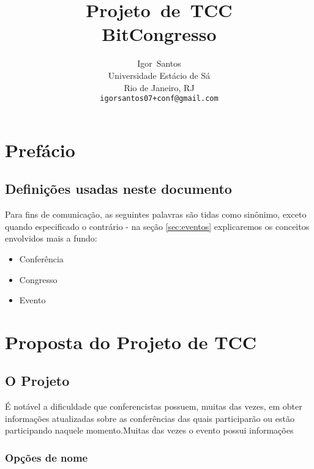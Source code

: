 \documentclass[a4paper]{abntex2}
\author{Igor~Santos\\
	Universidade Est\'acio de S\'a\\
	Rio de Janeiro, RJ\\
	\texttt{igorsantos07+conf@gmail.com}
}
\title{Projeto~de~TCC\\BitCongresso}
\begin{document}
\maketitle


\chapter*{Prefácio}
\section*{Definições usadas neste documento}
Para fins de comunicação, as seguintes palavras são tidas como sinônimo, exceto quando especificado o contrário - na seção \ref{sec:eventos} explicaremos os conceitos envolvidos mais a fundo:
\begin{itemize}
	\item Conferência
	\item Congresso
	\item Evento
\end{itemize}
\newpage

\tableofcontents

\chapter{Proposta do Projeto de TCC}

\section{O Projeto}

É notável a dificuldade que conferencistas possuem, muitas das vezes, em obter informações atualizadas sobre as conferências das quais participarão ou estão participando naquele momento.\footnotemark Muitas das vezes o evento possui informações 


\subsection*{Opções de nome}
\end{document}
